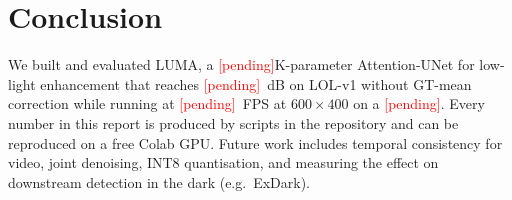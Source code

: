 \documentclass[10pt,twocolumn,letterpaper]{article}
\newcommand{\pending}{\textcolor{red}{[pending]}}
\providecommand{\OursParamsK}{\pending}\providecommand{\OursParamsM}{\pending}
\providecommand{\OursFPS}{\pending}\providecommand{\OursFPSHalf}{\pending}
\providecommand{\GPUName}{\pending}
\providecommand{\OursPSNRLolVOne}{\pending}\providecommand{\OursSSIMLolVOne}{\pending}
\begin{document}
\section{Conclusion}
We built and evaluated LUMA, a \OursParamsK{}K-parameter Attention-UNet for
low-light enhancement that reaches \OursPSNRLolVOne{}~dB on LOL-v1 without
GT-mean correction while running at \OursFPS{}~FPS at $600\times400$ on a
\GPUName{}. Every number in this report is produced by scripts in the
repository and can be reproduced on a free Colab GPU. Future work includes
temporal consistency for video, joint denoising, INT8 quantisation, and
measuring the effect on downstream detection in the dark (e.g.\ ExDark).

\small


\end{document}
